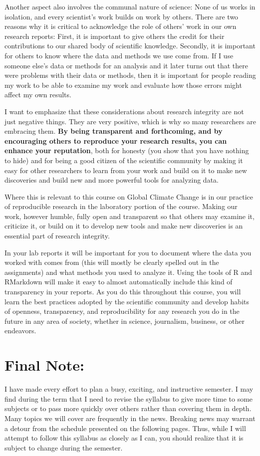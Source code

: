 \documentclass[11pt,twoside]{jgsyllabus}\usepackage[]{graphicx}\usepackage[]{color}
\begin{document}
Another aspect also involves the communal nature of science: None of us works
in isolation, and every scientist's work builds on work by others.
There are two reasons why it is critical to acknowledge the role of others' work
in our own research reports: First, it is important to give others the credit
for their contributions to our shared body of scientific knowledge. Secondly,
it is important for others to know where the data and methods we use come from.
If I use someone else's data or methods for an analysis and it later turns out
that there were problems with their data or methods, then it is important for
people reading my work to be able to examine my work and evaluate how those
errors might affect my own results.

I want to emphasize that these considerations about research integrity are not
just negative things. They are very positive, which is why so many researchers
are embracing them.
\textbf{By being transparent and forthcoming, and by encouraging
others to reproduce your research results, you can enhance your reputation},
both for honesty (you show that you have nothing to hide) and for being a
good citizen of the scientific community by making it easy for other researchers
to learn from your work and build on it to make new discoveries and build
new and more powerful tools for analyzing data.

Where this is relevant to this course on Global Climate Change is in our
practice of reproducible research in the laboratory portion of the course.
Making our work, however humble, fully open and transparent so that others
may examine it, criticize it, or build on it to develop new tools and make
new discoveries is an essential part of research integrity.

In your lab reports it will be important for you to document where the data you
worked with comes from (this will mostly be clearly spelled out in the
assignments) and what methods you used to analyze it. Using the tools of R and
RMarkdown will make it easy to almost automatically include this kind of
transparency in your reports. As you do this throughout this course, you will
learn the best practices adopted by the scientific community and develop habits
of openness, transparency, and reproducibility for any research you do in the
future in any area of society, whether in science, journalism, business, or
other endeavors.

\section{Final Note:}
I have made every effort to plan a busy, exciting, and instructive semester.
I may find during the term that I need to revise the syllabus to give more time
to some subjects or to pass more quickly over others rather than covering them
in depth. Many topics we will cover are frequently in the news. Breaking news
may warrant a detour from the schedule presented on the following pages.
Thus, while I will attempt to follow this syllabus as closely as I can,
you should realize that it is subject to change during the semester.
\end{document}
